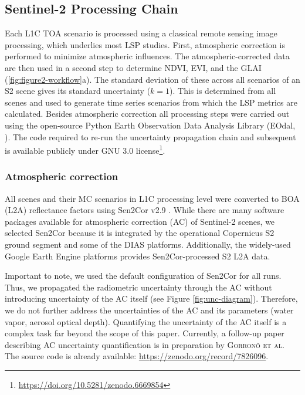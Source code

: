 \subsection{Sentinel-2 Processing Chain}
\label{sec:sentinel2-processing-chain}
Each L1C \gls{TOA} scenario is processed using a classical remote sensing image processing, which underlies most \gls{LSP} studies. First, atmospheric correction is performed to minimize atmospheric influences. The atmospheric-corrected data are then used in a second step to determine NDVI, EVI, and the \gls{GLAI} (\ref{fig:figure2-workflow}a). The standard deviation of these across all scenarios of an \gls{S2} scene gives its standard uncertainty ($k=1$). This is determined from all scenes and used to generate time series scenarios from which the \gls{LSP} metrics are calculated. Besides atmospheric correction all processing steps were carried out using the open-source Python Earth Observation Data Analysis Library (EOdal, \citep{graf_eodal_2022}). The code required to re-run the uncertainty propagation chain and subsequent is available publicly under GNU 3.0 license\footnote{\url{https://doi.org/10.5281/zenodo.6669854}}.

\subsubsection{Atmospheric correction}
\label{subsubsec:atcor}
All scenes and their \gls{MC} scenarios in L1C processing level were converted to BOA (L2A) reflectance factors using Sen2Cor v2.9 \cite{muller-wilm_sentinel-2_2013,main-knorn_sen2cor_2017}. While there are many software packages available for atmospheric correction (AC) of Sentinel-2 scenes, we selected Sen2Cor because it is integrated by the operational Copernicus \gls{S2} ground segment and some of the DIAS platforms. Additionally, the widely-used Google Earth Engine \citep{gorelick_google_2017} platforms provides Sen2Cor-processed \gls{S2} L2A data.

Important to note, we used the default configuration of Sen2Cor for all runs. Thus, we propagated the radiometric uncertainty through the AC without introducing uncertainty of the AC itself (see Figure \ref{fig:unc-diagram}). Therefore, we do not further address the uncertainties of the AC and its parameters (water vapor, aerosol optical depth). Quantifying the uncertainty of the AC itself is a complex task far beyond the scope of this paper. Currently, a follow-up paper describing AC uncertainty quantification is in preparation by \textsc{Gorron\~o et al.} The source code is already available: \url{https://zenodo.org/record/7826096}.

